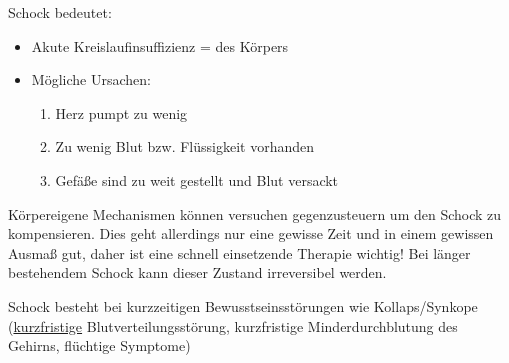 



Schock bedeutet:

\begin{itemize}
  \item Akute Kreislaufinsuffizienz =
   des Körpers
  \item Mögliche Ursachen:
  \begin{enumerate}
    \item Herz pumpt zu wenig
    \item Zu wenig Blut bzw. Flüssigkeit vorhanden
    \item Gefäße sind zu weit gestellt und Blut versackt
  \end{enumerate}
\end{itemize}


Körpereigene Mechanismen können versuchen gegenzusteuern
um den Schock zu kompensieren. Dies geht allerdings nur eine
gewisse Zeit und in einem gewissen Ausmaß gut, daher ist eine
schnell  einsetzende Therapie wichtig! Bei länger bestehendem Schock
kann dieser Zustand irreversibel werden. 

 Schock besteht bei kurzzeitigen 
Bewusstseinsstörungen wie Kollaps/Synkope
(\underline{kurzfristige} Blutverteilungsstörung,
kurzfristige Minderdurchblutung des Gehirns,  flüchtige Symptome)

